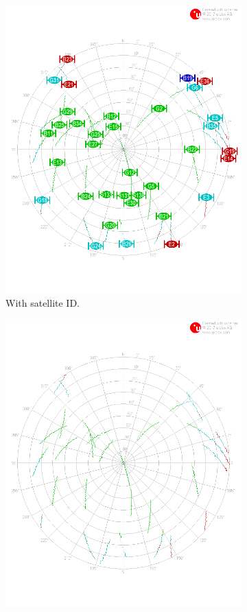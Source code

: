 \documentclass[letterpaper, 10 pt,onecolumn]{article}
\begin{document}
	\begin{figure}[H]
		\centering
		\begin{subfigure}{.5\textwidth}
			\includegraphics[width=0.9\linewidth]{../Moving_SingleBand/skyplot.png}
			\caption{With satellite ID.}
			\label{fig:mt1_sky}
		\end{subfigure}%
		\begin{subfigure}{.5\textwidth}
			\includegraphics[width=0.9\linewidth]{../Moving_SingleBand/skyplot_orbit.png}

\end{subfigure}
\end{figure}
\end{document}
